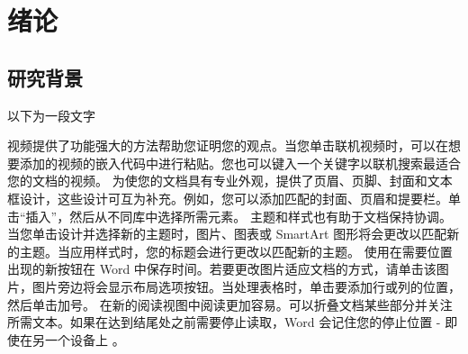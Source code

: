 \chapter{绪论}

\section{研究背景}

以下为一段文字

视频提供了功能强大的方法帮助您证明您的观点。当您单击联机视频时，可以在想要添加的视频的嵌入代码中进行粘贴。您也可以键入一个关键字以联机搜索最适合您的文档的视频。
为使您的文档具有专业外观，提供了页眉、页脚、封面和文本框设计，这些设计可互为补充。例如，您可以添加匹配的封面、页眉和提要栏。单击“插入”，然后从不同库中选择所需元素。
主题和样式也有助于文档保持协调。当您单击设计并选择新的主题时，图片、图表或 SmartArt 图形将会更改以匹配新的主题。当应用样式时，您的标题会进行更改以匹配新的主题。
使用在需要位置出现的新按钮在 Word 中保存时间。若要更改图片适应文档的方式，请单击该图片，图片旁边将会显示布局选项按钮。当处理表格时，单击要添加行或列的位置，然后单击加号。
在新的阅读视图中阅读更加容易。可以折叠文档某些部分并关注所需文本。如果在达到结尾处之前需要停止读取，Word 会记住您的停止位置 - 即使在另一个设备上
\cite{geim_van_2013}。

